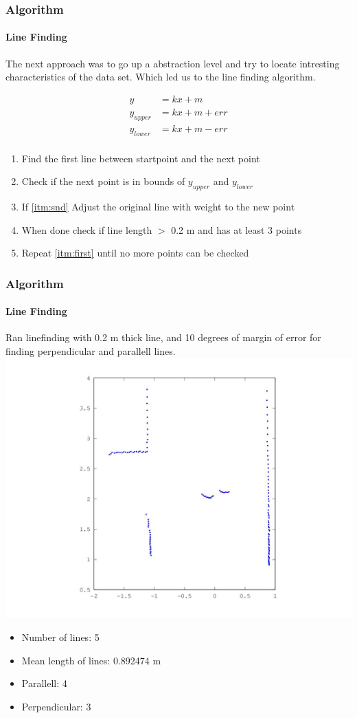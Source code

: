 \documentclass{beamer}
\begin{document}
\begin{frame}
\frametitle{Algorithm}
\framesubtitle{Line Finding}

The next approach was to go up a abstraction level and try to locate intresting characteristics of the data set.
Which led us to the line finding algorithm.
\pause

\begin{equation} \label{eq1}
\begin{split}
y & = kx + m \\
y_{upper}  & =  kx + m + err \\
y_{lower} & = kx + m - err \\
\end{split}
\end{equation}
\begin{enumerate}
\pause
\item{\label{itm:first}Find the first line between startpoint and the next point}
\item{\label{itm:snd}Check if the next point is in bounds of $y_{upper}$ and $y_{lower}$}
\item{If \ref{itm:snd} Adjust the original line with weight to the new point}
\item{When done check if line length $>$ 0.2 m and has at least 3 points}
\item{Repeat \ref{itm:first} until no more points can be checked}
\end{enumerate}


\end{frame}

\begin{frame}
\frametitle{Algorithm}
\framesubtitle{Line Finding}
Ran linefinding with 0.2 m thick line, and 10 degrees of margin of error for finding perpendicular and parallell lines.
\includegraphics[scale=0.3]{presimg/human.jpg}
\begin{itemize}
\item{Number of lines: 5}
\item{Mean length of lines: 0.892474 m}
\item{Parallell: 4}
\item{Perpendicular: 3}
\end{itemize}


\end{frame}
\end{document}
